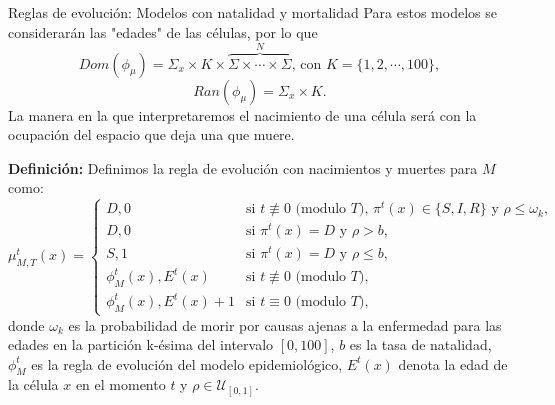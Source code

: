 \documentclass[9pt]{beamer}
\begin{document}
\begin{frame}{Reglas de evolución: Modelos con natalidad y mortalidad}
Para estos modelos se considerarán las "edades" de las células, por lo que
$$Dom(\phi_\mu)=\Sigma_x\times K\times\overbrace{\Sigma\times\cdots\times\Sigma}^N\text{, con }K=\{1,2,\cdots,100\},$$
$$Ran(\phi_\mu)=\Sigma_x\times K.$$
La manera en la que interpretaremos el nacimiento de una célula será con la ocupación del espacio que deja una que muere. %

\textbf{Definición:} Definimos la regla de evolución con nacimientos y muertes para $M$ como:
\begin{equation*}
    \mu_{M,T}^t(x)=\left\{\begin{array}{ll}
        D,0 & \text{si }t\not\equiv 0 \text{ (modulo }T\text{), }\pi^t(x)\in\{S,I,R\}\text{ y }\rho\leq\omega_k, \\
        D,0 & \text{si }\pi^t(x)=D\text{ y }\rho>b,\\
        S,1 & \text{si }\pi^t(x)=D\text{ y }\rho\leq b,\\
        \phi_M^t(x),E^t(x) & \text{si }t\not\equiv 0 \text{ (modulo }T),\\
        \phi_M^t(x),E^t(x)+1 & \text{si }t\equiv 0 \text{ (modulo }T),
    \end{array}\right.
\end{equation*}
donde $\omega_k$ es la probabilidad de morir por causas ajenas a la enfermedad para las edades en la partición k-ésima del intervalo $[0,100]$, $b$ es la tasa de natalidad, $\phi_M^t$ es la regla de evolución del modelo epidemiológico, $E^t(x)$ denota la edad de la célula $x$ en el momento $t$ y $\rho\in\mathcal{U}_{[0,1]}$.
\end{frame}

\end{document}
